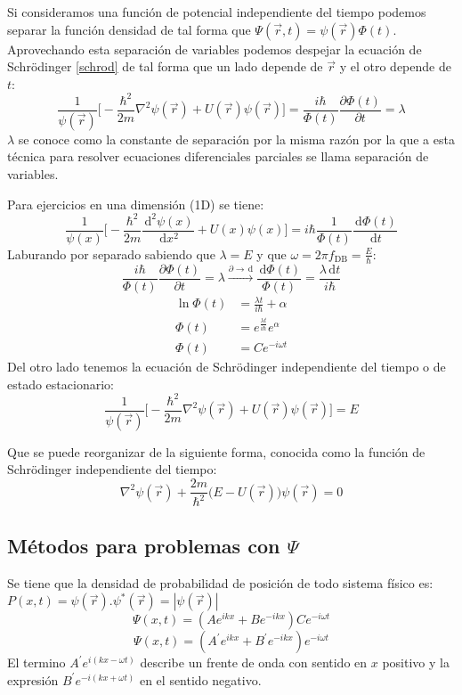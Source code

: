 \documentclass[10pt,twocolumn,titlepage]{article}
\newcommand{\Psixt}{\Psi (x,t)}
\newcommand{\frecdb}{f_{\textrm{DB}}}
\newcommand{\di}{\,\textrm{d}}
\begin{document}
Si consideramos una función de potencial independiente del tiempo podemos separar la función densidad de tal forma que $\Psi (\vec{r},t)=\psi(\vec{r}) \Phi(t)$. Aprovechando esta separación de variables podemos despejar la ecuación de Schrödinger \eqref{schrod} de tal forma que un lado depende de $\vec{r}$ y el otro depende de $t$: 
$$\frac{1}{\psi(\vec{r})}\bigg[ -\frac{\hbar^2}{2m}\nabla^2 \psi(\vec{r}) +U(\vec{r})\psi(\vec{r}) \bigg]=\frac{i\hbar}{\Phi(t)}\frac{\partial \Phi(t)}{\partial t} =\lambda $$
$\lambda$ se conoce como la constante de separación por la misma razón por la que a esta técnica para resolver ecuaciones diferenciales parciales se llama separación de variables. \par
Para ejercicios en una dimensión (1D) se tiene:
$$\frac{1}{\psi(x)} \bigg[ -\frac{\hbar^2}{2m}\frac{\di ^2\psi(x)}{\di x^2}+U(x)\psi(x) \bigg]=i\hbar \frac{1}{\Phi(t)}\frac{\di \Phi(t)}{\di t}$$
Laburando por separado sabiendo que $\lambda=E$ y que $\omega=2\pi\frecdb=\frac{E}{\hbar}$:
$$\frac{i\hbar}{\Phi(t)}\frac{\partial\Phi(t)}{\partial t}=\lambda \xrightarrow[]{\partial \rightarrow \di} \frac{\di \Phi(t) }{\Phi(t)}=\frac{\lambda \di t}{i\hbar}$$ 
\begin{align*}
\ln\Phi(t)&=\frac{\lambda t}{i\hbar}+\alpha \\
\Phi(t)&=e^{\frac{\lambda t}{i\hbar}} e^\alpha \\
\Phi(t)&= Ce^{-i\omega t}
\end{align*}
Del otro lado tenemos la ecuación de Schrödinger independiente del tiempo o de estado estacionario:
\begin{equation} \label{hamiltonianoschrodinger}
\frac{1}{\psi(\vec{r})}\bigg[ -\frac{\hbar^2}{2m}\nabla^2 \psi(\vec{r}) +U(\vec{r})\psi(\vec{r}) \bigg]= E
\end{equation}

Que se puede reorganizar de la siguiente forma, conocida como la función de Schrödinger independiente del tiempo:
\begin{equation} \label{schrodpos}
\nabla^2 \psi(\vec{r}) +\frac{2m}{\hbar^2}\big(E- U(\vec{r})\big) \psi(\vec{r})=0
\end{equation}

\subsection[Ejercicios con función probabilidad]{Métodos para problemas con $\Psi$} \label{sect:probpsi}
Se tiene que la densidad de probabilidad de posición de todo sistema físico es: $P(x,t)=\psi(\vec{r}).\psi^*(\vec{r})=|\psi(\vec{r})|$
$$  \Psixt =(Ae^{ikx} + Be^{-ikx})Ce^{-i\omega t } $$
\begin{equation} \label{funciononda1d}
\Psixt = (A^\prime e^{ikx}+B^\prime e^{-ikx})e^{-i \omega t}  
\end{equation}
El termino $A^\prime e^{ i(kx-\omega t) }$ describe un frente de onda con sentido en $x$ positivo y la expresión $B^\prime e^{-i(kx+\omega t)}$ en el sentido negativo. 
\end{document}
